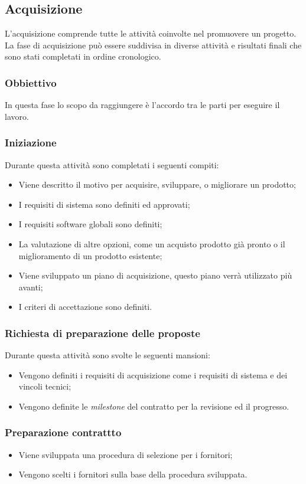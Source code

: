 \documentclass[12pt,a4paper,titlepage]{article}
\begin{document}
\subsection {Acquisizione}
L'acquisizione comprende tutte le attività coinvolte nel promuovere un progetto. La fase di acquisizione può essere suddivisa in diverse attività e risultati finali che sono stati completati in ordine cronologico.
\subsubsection {Obbiettivo}
In questa fase lo scopo da raggiungere è l'accordo tra le parti per eseguire il lavoro.
\subsubsection {Iniziazione}
Durante questa attività sono completati i seguenti compiti:
\begin{itemize}
	\item Viene descritto il motivo per acquisire, sviluppare, o migliorare un prodotto;
	\item I requisiti di sistema sono definiti ed approvati;
	\item I requisiti software globali sono definiti;
	\item La valutazione di altre opzioni, come un acquisto prodotto già pronto o il miglioramento di un prodotto esistente;
	\item Viene sviluppato un piano di acquisizione, questo piano verrà utilizzato più avanti;
	\item I criteri di accettazione sono definiti.
\end{itemize}
\subsubsection {Richiesta di preparazione delle proposte}
Durante questa attività sono svolte le seguenti mansioni:
\begin{itemize}
	\item Vengono definiti i  requisiti di acquisizione come i requisiti di sistema e dei vincoli tecnici;
	\item Vengono definite le \textit{milestone} del contratto per la revisione ed   il  progresso.
\end{itemize}
\subsubsection {Preparazione contrattto}
\begin {itemize}
	\item Viene sviluppata una procedura di selezione per i fornitori;
	\item Vengono scelti i fornitori sulla base della procedura sviluppata.
\end {itemize}
\end{document}
